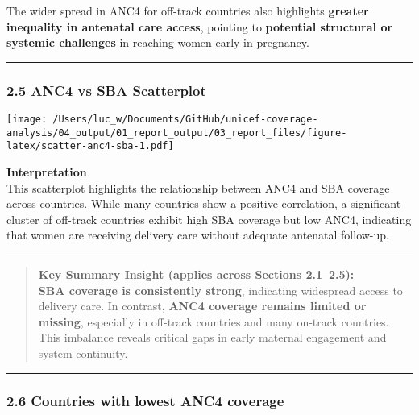\documentclass[
]{article}
\begin{document}
The wider spread in ANC4 for off-track countries also highlights
\textbf{greater inequality in antenatal care access}, pointing to
\textbf{potential structural or systemic challenges} in reaching women
early in pregnancy.

\begin{center}\rule{0.5\linewidth}{0.5pt}\end{center}

\subsubsection{2.5 ANC4 vs SBA
Scatterplot}\label{anc4-vs-sba-scatterplot}

\texttt{[image: /Users/luc\_w/Documents/GitHub/unicef-coverage-analysis/04\_output/01\_report\_output/03\_report\_files/figure-latex/scatter-anc4-sba-1.pdf]}

\textbf{Interpretation}\\
This scatterplot highlights the relationship between ANC4 and SBA
coverage across countries. While many countries show a positive
correlation, a significant cluster of off-track countries exhibit high
SBA coverage but low ANC4, indicating that women are receiving delivery
care without adequate antenatal follow-up.

\begin{center}\rule{0.5\linewidth}{0.5pt}\end{center}

\begin{quote}
\textbf{Key Summary Insight (applies across Sections 2.1--2.5):}\\
\textbf{SBA coverage is consistently strong}, indicating widespread
access to delivery care. In contrast, \textbf{ANC4 coverage remains
limited or missing}, especially in off-track countries and many on-track
countries. This imbalance reveals critical gaps in early maternal
engagement and system continuity.
\end{quote}

\begin{center}\rule{0.5\linewidth}{0.5pt}\end{center}

\subsubsection{2.6 Countries with lowest ANC4
coverage}\label{countries-with-lowest-anc4-coverage}
\end{document}

